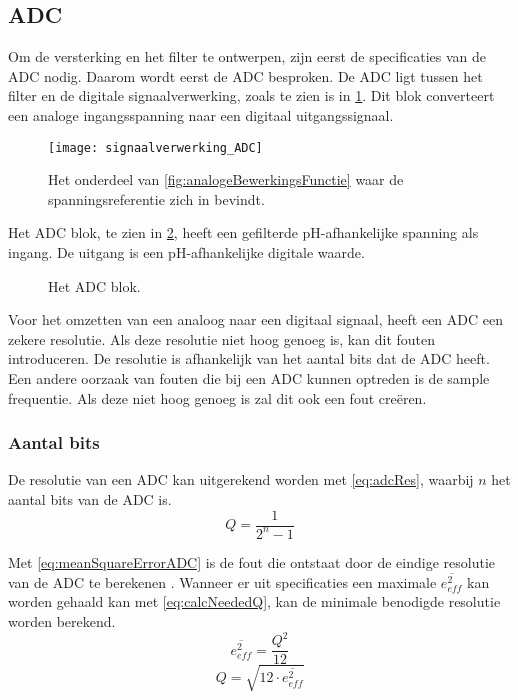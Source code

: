 \subsection{ADC}
Om de versterking en het filter te ontwerpen, zijn eerst de specificaties van de ADC nodig. Daarom wordt eerst de ADC besproken. De ADC ligt tussen het filter en de digitale signaalverwerking, zoals te zien is in \cref{fig:ADCInSchema}. Dit blok converteert een analoge ingangsspanning naar een digitaal uitgangssignaal.

\begin{figure}[!htbp]
    \centering
    \texttt{[image: signaalverwerking\_ADC]}
    \caption{Het onderdeel van \cref{fig:analogeBewerkingsFunctie} waar de spanningsreferentie zich in bevindt.}
    \label{fig:ADCInSchema}
\end{figure}

Het ADC blok, te zien in \cref{fig:ADCBlok}, heeft een gefilterde pH-afhankelijke spanning als ingang. De uitgang is een pH-afhankelijke digitale waarde.

\begin{figure}[!htbp]
    \centering
    \def\svgwidth{0.4\textwidth}
    
    \caption{Het ADC blok.}
    \label{fig:ADCBlok}
\end{figure}

Voor het omzetten van een analoog naar een digitaal signaal, heeft een ADC een zekere resolutie. Als deze resolutie niet hoog genoeg is, kan dit fouten introduceren. De resolutie is afhankelijk van het aantal bits dat de ADC heeft. Een andere oorzaak van fouten die bij een ADC kunnen optreden is de sample frequentie. Als deze niet hoog genoeg is zal dit ook een fout creëren.

\subsubsection{Aantal bits} \label{sec:ADC:numBits}
De resolutie van een ADC kan uitgerekend worden met \cref{eq:adcRes}, waarbij $n$ het aantal bits van de ADC is.
\begin{equation}\label{eq:adcRes}
    Q=\frac{1}{2^n-1}
\end{equation}

Met \cref{eq:meanSquareErrorADC} is de fout die ontstaat door de eindige resolutie van de ADC te berekenen \cite{MJHcalcADC}. Wanneer er uit specificaties een maximale $\overline{e_{eff}^2}$ kan worden gehaald kan met \cref{eq:calcNeededQ}, kan de minimale benodigde resolutie worden berekend.
\begin{equation}\label{eq:meanSquareErrorADC}
    \overline{e_{eff}^2}=\frac{Q^2}{12}
\end{equation}
\begin{equation}\label{eq:calcNeededQ}
    Q=\sqrt{12\cdot\overline{e_{eff}^2}}
\end{equation}

